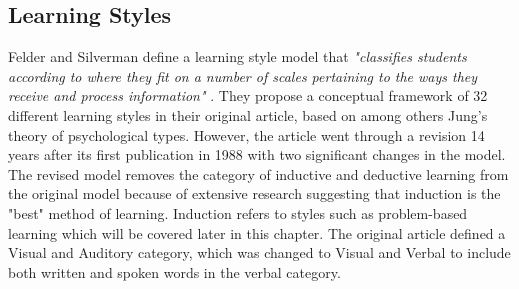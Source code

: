 \subsection*{Learning Styles}
Felder and Silverman define a learning style model that \textit{"classifies students according to where they fit on a number of scales pertaining to the ways they receive and process information"} \cite[p. 674]{Felder88k.:learning}. They propose a conceptual framework of 32 different learning styles in their original article, based on among others Jung's theory of psychological types. However, the article went through a revision 14 years after its first publication in 1988 with two significant changes in the model. The revised model removes the category of inductive and deductive learning from the original model because of extensive research suggesting that induction is the "best" method of learning. Induction refers to styles such as problem-based learning which will be covered later in this chapter. The original article defined a Visual and Auditory category, which was changed to Visual and Verbal to include both written and spoken words in the verbal category.  

